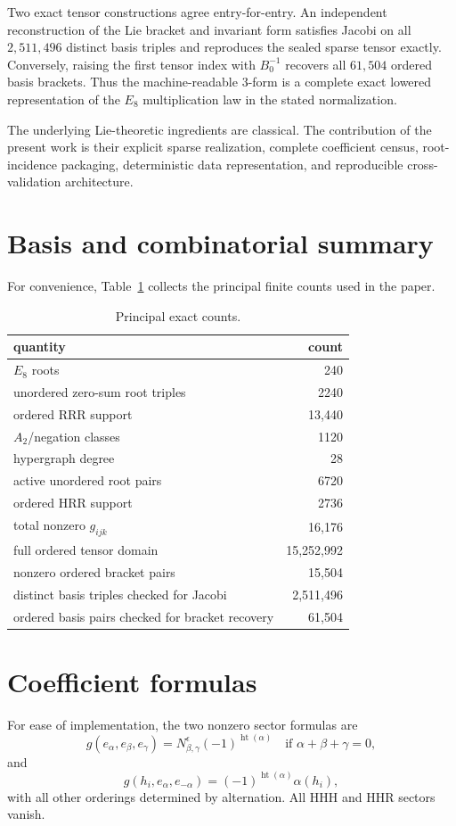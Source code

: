 \documentclass[11pt]{article}
\theoremstyle{definition}
\theoremstyle{remark}
\begin{document}
Two exact tensor constructions agree entry-for-entry.  An independent reconstruction of the Lie bracket and invariant form satisfies Jacobi on all $2{,}511{,}496$ distinct basis triples and reproduces the sealed sparse tensor exactly.  Conversely, raising the first tensor index with $B_0^{-1}$ recovers all $61{,}504$ ordered basis brackets.  Thus the machine-readable $3$-form is a complete exact lowered representation of the $E_8$ multiplication law in the stated normalization.

The underlying Lie-theoretic ingredients are classical.  The contribution of the present work is their explicit sparse realization, complete coefficient census, root-incidence packaging, deterministic data representation, and reproducible cross-validation architecture.

\appendix
\section{Basis and combinatorial summary}

For convenience, Table~\ref{tab:summary} collects the principal finite counts used in the paper.

\begin{table}[ht]
\centering
\caption{Principal exact counts.}
\label{tab:summary}
\begin{tabular}{lr}
\toprule
quantity & count\\
\midrule
$E_8$ roots & 240\\
unordered zero-sum root triples & 2240\\
ordered RRR support & 13,440\\
$A_2$/negation classes & 1120\\
hypergraph degree & 28\\
active unordered root pairs & 6720\\
ordered HRR support & 2736\\
total nonzero $g_{ijk}$ & 16,176\\
full ordered tensor domain & 15,252,992\\
nonzero ordered bracket pairs & 15,504\\
distinct basis triples checked for Jacobi & 2,511,496\\
ordered basis pairs checked for bracket recovery & 61,504\\
\bottomrule
\end{tabular}
\end{table}

\section{Coefficient formulas}

For ease of implementation, the two nonzero sector formulas are
\[
g(e_\alpha,e_\beta,e_\gamma)
=
N_{\beta,\gamma}^{\epsilon}(-1)^{\operatorname{ht}(\alpha)}
\quad\text{if }\alpha+\beta+\gamma=0,
\]
and
\[
g(h_i,e_\alpha,e_{-\alpha})
=(-1)^{\operatorname{ht}(\alpha)}\alpha(h_i),
\]
with all other orderings determined by alternation.  All HHH and HHR sectors vanish.



\end{document}
